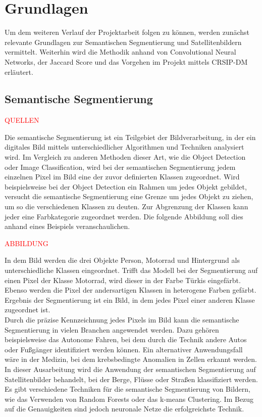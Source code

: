 \newpage
\section{Grundlagen}\label{sec:grundlagen}

Um dem weiteren Verlauf der Projektarbeit folgen zu können, werden zunächst relevante
Grundlagen zur Semantischen Segmentierung und Satellitenbildern vermittelt.
Weiterhin wird die Methodik anhand von Convolutional Neural Networks, der Jaccard Score
und das Vorgehen im Projekt mittels CRSIP-DM erläutert.

\subsection{Semantische Segmentierung}

{\textcolor{red}{QUELLEN}}

Die semantische Segmentierung ist ein Teilgebiet der Bildverarbeitung, in der ein digitales Bild mittels
unterschiedlicher Algorithmen und Techniken analysiert wird.
Im Vergleich zu anderen Methoden dieser Art, wie die Object Detection oder Image Classification, wird bei der
semantischen Segmentierung jedem einzelnen Pixel im Bild eine der zuvor definierten Klassen zugeordnet.
Wird beispielsweise bei der Object Detection ein Rahmen um jedes Objekt gebildet, versucht die semantische
Segmentierung eine Grenze um jedes Objekt zu ziehen, um so die verschiedenen Klassen zu deuten.
Zur Abgrenzung der Klassen kann jeder eine Farbkategorie zugeordnet werden. Die folgende Abbildung soll dies
anhand eines Beispiels veranschaulichen.

    {\textcolor{red}{ABBILDUNG}}

In dem Bild werden die drei Objekte Person, Motorrad und Hintergrund als unterschiedliche Klassen eingeordnet.
Trifft das Modell bei der Segmentierung auf einen Pixel der Klasse Motorrad, wird dieser in der Farbe Türkis eingefärbt.
Ebenso werden die Pixel der andersartigen Klassen in heterogene Farben gefärbt.
Ergebnis der Segmentierung ist ein Bild, in dem jedes Pixel einer anderen Klasse zugeordnet ist. \\
Durch die präzise Kennzeichnung jedes Pixels im Bild kann die semantische Segmentierung in vielen Branchen
angewendet werden.
Dazu gehören beispielsweise das Autonome Fahren, bei dem durch die Technik andere Autos oder Fußgänger identifiziert
werden können.
Ein alternativer Anwendungsfall wäre in der Medizin, bei dem krebsbedingte Anomalien in Zellen erkannt werden.
In dieser Ausarbeitung wird die Anwendung der semantischen Segmentierung auf Satellitenbilder behandelt, bei der Berge,
Flüsse oder Straßen klassifiziert werden. \\
Es gibt verschiedene Techniken für die semantische Segmentierung von Bildern, wie das Verwenden von Random
Forests oder das k-means Clustering.
Im Bezug auf die Genauigkeiten sind jedoch neuronale Netze die erfolgreichste Technik.

